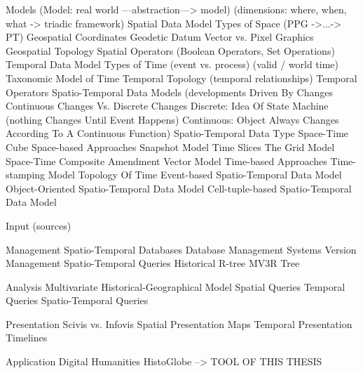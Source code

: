 Models
        (Model: real world ---abstraction---> model)
        (dimensions: where, when, what -> triadic framework)
  Spatial Data Model
    Types of Space
        (PPG ->...-> PT)
    Geospatial Coordinates
    Geodetic Datum
    Vector vs. Pixel Graphics
    Geospatial Topology
    Spatial Operators
        (Boolean Operators, Set Operations)
  Temporal Data Model
    Types of Time
        (event vs. process)
        (valid / world time)
    Taxonomic Model of Time
    Temporal Topology
        (temporal relationships)
    Temporal Operators
  Spatio-Temporal Data Models
        (developments Driven By Changes
        Continuous Changes Vs. Discrete Changes
        Discrete: Idea Of State Machine (nothing Changes Until Event Happens)
        Continuous: Object Always Changes According To A Continuous Function)
    Spatio-Temporal Data Type
    Space-Time Cube
    Space-based Approaches
      Snapshot Model
      Time Slices
      The Grid Model
      Space-Time Composite
      Amendment Vector Model
    Time-based Approaches
      Time-stamping Model Topology Of Time
      Event-based Spatio-Temporal Data Model
      Object-Oriented Spatio-Temporal Data Model
      Cell-tuple-based Spatio-Temporal Data Model

Input
        (sources)

Management
  Spatio-Temporal Databases
    Database Management Systems
    Version Management
    Spatio-Temporal Queries
  Historical R-tree
  MV3R Tree

Analysis
  Multivariate Historical-Geographical Model
  Spatial Queries
  Temporal Queries
  Spatio-Temporal Queries

Presentation
  Scivis vs. Infovis
  Spatial Presentation
    Maps
  Temporal Presentation
    Timelines

Application
  Digital Humanities
  HistoGlobe --> TOOL OF THIS THESIS